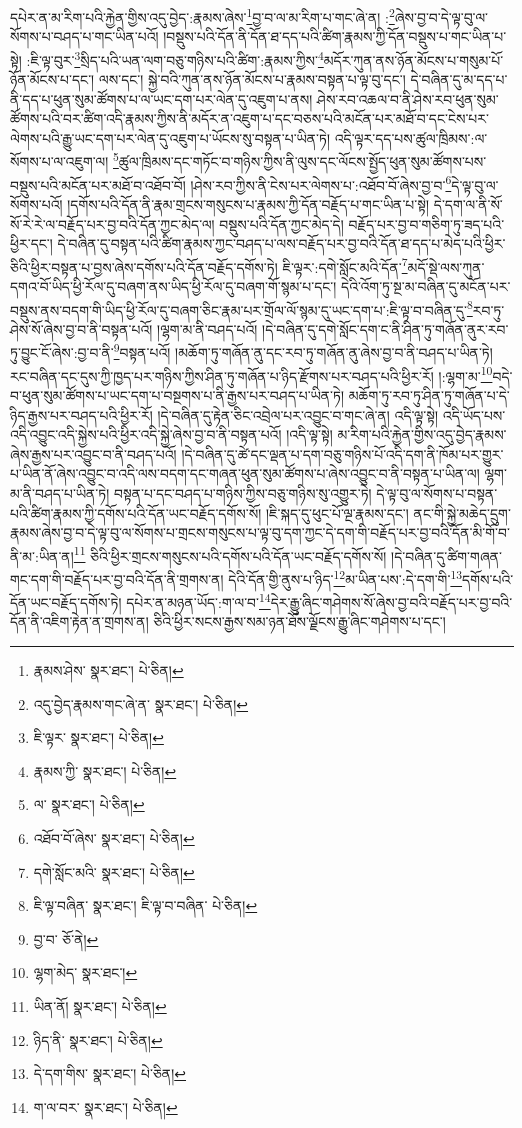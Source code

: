 དཔེར་ན་མ་རིག་པའི་རྐྱེན་གྱིས་འདུ་བྱེད་:རྣམས་ཞེས་\footnote{རྣམས་ཤེས་  སྣར་ཐང་།  པེ་ཅིན། }བྱ་བ་ལ་མ་རིག་པ་གང་ཞེ་ན། :\footnote{འདུ་བྱེད་རྣམས་གང་ཞེ་ན་  སྣར་ཐང་།  པེ་ཅིན། }ཞེས་བྱ་བ་དེ་ལྟ་བུ་ལ་སོགས་པ་བཤད་པ་གང་ཡིན་པའོ། །བསྡུས་པའི་དོན་ནི་དོན་ཐ་དད་པའི་ཚིག་རྣམས་ཀྱི་དོན་བསྡུས་པ་གང་ཡིན་པ་སྟེ། :ཇི་ལྟ་བུར་\footnote{ཇི་ལྟར་  སྣར་ཐང་།  པེ་ཅིན། }སྲིད་པའི་ཡན་ལག་བཅུ་གཉིས་པའི་ཚིག་:རྣམས་ཀྱིས་\footnote{རྣམས་ཀྱི་  སྣར་ཐང་།  པེ་ཅིན། }མདོར་ཀུན་ནས་ཉོན་མོངས་པ་གསུམ་པོ་ཉོན་མོངས་པ་དང་། ལས་དང་། སྐྱེ་བའི་ཀུན་ནས་ཉོན་མོངས་པ་རྣམས་བསྟན་པ་ལྟ་བུ་དང་། དེ་བཞིན་དུ་མ་དད་པ་ནི་དད་པ་ཕུན་སུམ་ཚོགས་པ་ལ་ཡང་དག་པར་ལེན་དུ་འཇུག་པ་ནས། ཤེས་རབ་འཆལ་བ་ནི་ཤེས་རབ་ཕུན་སུམ་ཚོགས་པའི་བར་ཚིག་འདི་རྣམས་ཀྱིས་ནི་མདོར་ན་འཇུག་པ་དང་བཅས་པའི་མངོན་པར་མཐོ་བ་དང་ངེས་པར་ལེགས་པའི་རྒྱུ་ཡང་དག་པར་ལེན་དུ་འཇུག་པ་ཡོངས་སུ་བསྟན་པ་ཡིན་ཏེ། འདི་ལྟར་དད་པས་ཚུལ་ཁྲིམས་:ལ་སོགས་པ་ལ་འཇུག་ལ། \footnote{ལ་  སྣར་ཐང་།  པེ་ཅིན། }ཚུལ་ཁྲིམས་དང་གཏོང་བ་གཉིས་ཀྱིས་ནི་ལུས་དང་ལོངས་སྤྱོད་ཕུན་སུམ་ཚོགས་པས་བསྡུས་པའི་མངོན་པར་མཐོ་བ་འཐོབ་བོ། །ཤེས་རབ་ཀྱིས་ནི་ངེས་པར་ལེགས་པ་:འཐོབ་བོ་ཞེས་བྱ་བ་\footnote{འཐོབ་བོ་ཞེས་  སྣར་ཐང་།  པེ་ཅིན། }དེ་ལྟ་བུ་ལ་སོགས་པའོ། །དགོས་པའི་དོན་ནི་རྣམ་གྲངས་གསུངས་པ་རྣམས་ཀྱི་དོན་བརྗོད་པ་གང་ཡིན་པ་སྟེ། དེ་དག་ལ་ནི་སོ་སོ་རེ་རེ་ལ་བརྗོད་པར་བྱ་བའི་དོན་ཀྱང་མེད་ལ། བསྡུས་པའི་དོན་ཀྱང་མེད་དེ། བརྗོད་པར་བྱ་བ་གཅིག་ཏུ་ཟད་པའི་ཕྱིར་དང་། དེ་བཞིན་དུ་བསྟན་པའི་ཚིག་རྣམས་ཀྱང་བཤད་པ་ལས་བརྗོད་པར་བྱ་བའི་དོན་ཐ་དད་པ་མེད་པའི་ཕྱིར་ཅིའི་ཕྱིར་བསྟན་པ་བྱས་ཞེས་དགོས་པའི་དོན་བརྗོད་དགོས་ཏེ། ཇི་ལྟར་:དགེ་སློང་མའི་དོན་\footnote{དགེ་སློང་མའི་  སྣར་ཐང་།  པེ་ཅིན། }མདོ་སྡེ་ལས་ཀུན་དགའ་བོ་ཡིད་ཕྱི་རོལ་དུ་བཞག་ནས་ཡིད་ཕྱི་རོལ་དུ་བཞག་གོ་སྙམ་པ་དང་། དེའི་འོག་ཏུ་སྔ་མ་བཞིན་དུ་མངོན་པར་བསྡུས་ནས་བདག་གི་ཡིད་ཕྱི་རོལ་དུ་བཞག་ཅིང་རྣམ་པར་གྲོལ་ལོ་སྙམ་དུ་ཡང་དག་པ་:ཇི་ལྟ་བ་བཞིན་དུ་\footnote{ཇི་ལྟ་བཞིན་  སྣར་ཐང་། ཇི་ལྟ་བ་བཞིན་  པེ་ཅིན། }རབ་ཏུ་ཤེས་སོ་ཞེས་བྱ་བ་ནི་བསྟན་པའོ། །ལྷག་མ་ནི་བཤད་པའོ། །དེ་བཞིན་དུ་དགེ་སློང་དག་ང་ནི་ཤིན་ཏུ་གཞོན་ནུར་རབ་ཏུ་བྱུང་ངོ་ཞེས་:བྱ་བ་ནི་\footnote{བྱ་བ་  ཅོ་ནེ། }བསྟན་པའོ། །མཆོག་ཏུ་གཞོན་ནུ་དང་རབ་ཏུ་གཞོན་ནུ་ཞེས་བྱ་བ་ནི་བཤད་པ་ཡིན་ཏེ། རང་བཞིན་དང་དུས་ཀྱི་ཁྱད་པར་གཉིས་ཀྱིས་ཤིན་ཏུ་གཞོན་པ་ཉིད་རྫོགས་པར་བཤད་པའི་ཕྱིར་རོ། །:ལྷག་མ་\footnote{ལྷག་མེད་  སྣར་ཐང་། }བདེ་བ་ཕུན་སུམ་ཚོགས་པ་ཡང་དག་པ་བསྔགས་པ་ནི་རྒྱས་པར་བཤད་པ་ཡིན་ཏེ། མཆོག་ཏུ་རབ་ཏུ་ཤིན་ཏུ་གཞོན་པ་དེ་ཉིད་རྒྱས་པར་བཤད་པའི་ཕྱིར་རོ། །དེ་བཞིན་དུ་རྟེན་ཅིང་འབྲེལ་པར་འབྱུང་བ་གང་ཞེ་ན། འདི་ལྟ་སྟེ། འདི་ཡོད་པས་འདི་འབྱུང་འདི་སྐྱེས་པའི་ཕྱིར་འདི་སྐྱེ་ཞེས་བྱ་བ་ནི་བསྟན་པའོ། །འདི་ལྟ་སྟེ། མ་རིག་པའི་རྐྱེན་གྱིས་འདུ་བྱེད་རྣམས་ཞེས་རྒྱས་པར་འབྱུང་བ་ནི་བཤད་པའོ། །དེ་བཞིན་དུ་ཚེ་དང་ལྡན་པ་དག་བཅུ་གཉིས་པོ་འདི་དག་ནི་ཁོམ་པར་གྱུར་པ་ཡིན་ནོ་ཞེས་འབྱུང་བ་འདི་ལས་བདག་དང་གཞན་ཕུན་སུམ་ཚོགས་པ་ཞེས་འབྱུང་བ་ནི་བསྟན་པ་ཡིན་ལ། ལྷག་མ་ནི་བཤད་པ་ཡིན་ཏེ། བསྟན་པ་དང་བཤད་པ་གཉིས་ཀྱིས་བཅུ་གཉིས་སུ་འགྱུར་ཏེ། དེ་ལྟ་བུ་ལ་སོགས་པ་བསྟན་པའི་ཚིག་རྣམས་ཀྱི་དགོས་པའི་དོན་ཡང་བརྗོད་དགོས་སོ། །ཇི་སྐད་དུ་ཕུང་པོ་ལྔ་རྣམས་དང་། ནང་གི་སྐྱེ་མཆེད་དྲུག་རྣམས་ཞེས་བྱ་བ་དེ་ལྟ་བུ་ལ་སོགས་པ་གྲངས་གསུངས་པ་ལྟ་བུ་དག་ཀྱང་དེ་དག་གི་བརྗོད་པར་བྱ་བའི་དོན་མི་གོ་བ་ནི་མ་:ཡིན་ན།\footnote{ཡིན་ནོ།  སྣར་ཐང་།  པེ་ཅིན། } ཅིའི་ཕྱིར་གྲངས་གསུངས་པའི་དགོས་པའི་དོན་ཡང་བརྗོད་དགོས་སོ། །དེ་བཞིན་དུ་ཚིག་གཞན་གང་དག་གི་བརྗོད་པར་བྱ་བའི་དོན་ནི་གྲགས་ན། དེའི་དོན་གྱི་ནུས་པ་ཉིད་\footnote{ཉིད་ནི་  སྣར་ཐང་།  པེ་ཅིན། }མ་ཡིན་པས་:དེ་དག་གི་\footnote{དེ་དག་གིས་  སྣར་ཐང་།  པེ་ཅིན། }དགོས་པའི་དོན་ཡང་བརྗོད་དགོས་ཏེ། དཔེར་ན་མཉན་ཡོད་:ག་ལ་བ་\footnote{ག་ལ་བར་  སྣར་ཐང་།  པེ་ཅིན། }དེར་རྒྱུ་ཞིང་གཤེགས་སོ་ཞེས་བྱ་བའི་བརྗོད་པར་བྱ་བའི་དོན་ནི་འཇིག་རྟེན་ན་གྲགས་ན། ཅིའི་ཕྱིར་སངས་རྒྱས་སམ་ཉན་ཐོས་ལྗོངས་རྒྱུ་ཞིང་གཤེགས་པ་དང་། 